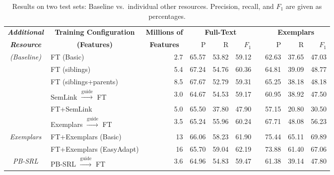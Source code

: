 \begin{table*}\centering\small
\begin{tabular}{>{\itshape}clr<{\hspace*{15pt}}rrr@{~~}r@{~~}rrr}
\toprule
\normalfont\textbf{Additional} & \multicolumn{1}{c}{\textbf{Training Configuration}} & \multicolumn{1}{c}{\textbf{Millions of}} & \multicolumn{3}{c}{\textbf{Full-Text}} && \multicolumn{3}{c}{\textbf{Exemplars}} \\
\cline{4-6}\cline{8-10}
\normalfont\textbf{Resource} &  \multicolumn{1}{c}{\textbf{(Features)}} & \multicolumn{1}{c}{\textbf{Features}} & P\hphantom{11} & R\hphantom{11} & $F_1$\hphantom{0} && P\hphantom{11} & R\hphantom{11} & $F_1$\hphantom{0} \\
\midrule
(Baseline) & FT (Basic) & 2.7 & 65.57 & 53.82 & 59.12 && 62.63 & 37.65 & 47.03 \\
\midrule
\multirow{2}{*}{FN Hierarchy} & FT (siblings) & 5.4 & 67.24 & 54.76 & 60.36 && 64.81 & 39.09 & 48.77 \\
          & FT (siblings+parents) & 8.5 & 67.67 & 52.79 & 59.31 && 65.25 & 38.18 & 48.18 \\
\midrule
\multirow{2}{*}{SemLink} & SemLink $\xrightarrow{\text{guide}}$ FT & 3.0 & 64.67 & 54.53 & 59.17 && 60.95 & 38.92 & 47.50 \\
& FT+SemLink & 5.0 & 65.50 & 37.80 & 47.90 && 57.15 & 20.80 & 30.50 \\
\midrule
& Exemplars $\xrightarrow{\text{guide}}$ FT & 3.5 & 65.24 & 55.96 & 60.24 && 67.71 & 48.08 & 56.23\\
Exemplars & FT+Exemplars (Basic) & 13\nss{.?} & 66.06 & 58.23 & 61.90 && 75.44 & 65.11 & 69.89 \\
& FT+Exemplars (EasyAdapt) & 16\nss{.?} & 65.70 & 59.04 & 62.19 && 73.88 & 61.40 & 67.06 \\
\midrule
PB-SRL & PB-SRL $\xrightarrow{\text{guide}}$ FT & 3.6 & 64.96 & 54.83 & 59.47 && 61.38 & 39.14 & 47.80 \\
\bottomrule
\end{tabular}
\caption{Results on two test sets: Baseline vs.~individual other resources. 
Precision, recall, and $F_1$ are given as percentages.}
\label{tbl:results}
\end{table*}

